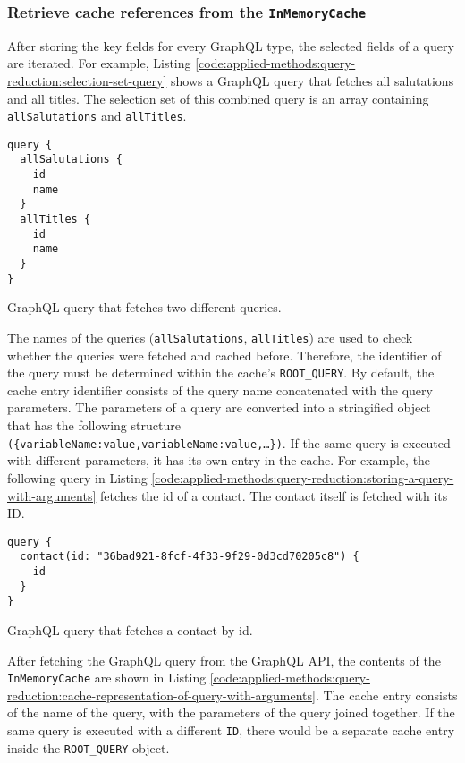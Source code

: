 \subsubsection{Retrieve cache references from the \texttt{InMemoryCache}}

After storing the key fields for every GraphQL type, the selected fields of a query are iterated. For example, Listing \ref{code:applied-methods:query-reduction:selection-set-query} shows a GraphQL query that fetches all salutations and all titles. The selection set of this combined query is an array containing \texttt{allSalutations} and \texttt{allTitles}.

\ifshowListings
\begin{listing}[H]
  \begin{verbatim}
query {
  allSalutations {
    id
    name
  }
  allTitles {
    id
    name
  }
}
  \end{verbatim}
  \caption{GraphQL query that fetches two different queries.}\label{code:applied-methods:query-reduction:selection-set-query}
\end{listing}
\fi

\noindent The names of the queries (\texttt{allSalutations}, \texttt{allTitles}) are used to check whether the queries were fetched and cached before. Therefore, the identifier of the query must be determined within the cache's \texttt{ROOT\_QUERY}. By default, the cache entry identifier consists of the query name concatenated with the query parameters. The parameters of a query are converted into a stringified object that has the following structure \texttt{(\{variableName:value,variableName:value,\dots\})}. If the same query is executed with different parameters, it has its own entry in the cache. For example, the following query in Listing \ref{code:applied-methods:query-reduction:storing-a-query-with-arguments} fetches the id of a contact. The contact itself is fetched with its \ac{ID}.

\ifshowListings
\begin{listing}[H]
  \begin{verbatim}
query {
  contact(id: "36bad921-8fcf-4f33-9f29-0d3cd70205c8") {
    id
  }
}
  \end{verbatim}
  \caption{GraphQL query that fetches a contact by id.}\label{code:applied-methods:query-reduction:storing-a-query-with-arguments}
  \end{listing}
\fi

\noindent After fetching the GraphQL query from the GraphQL \ac{API}, the contents of the \texttt{InMemoryCache} are shown in Listing \ref{code:applied-methods:query-reduction:cache-representation-of-query-with-arguments}. The cache entry consists of the name of the query, with the parameters of the query joined together. If the same query is executed with a different \texttt{ID}, there would be a separate cache entry inside the \texttt{ROOT\_QUERY} object.

